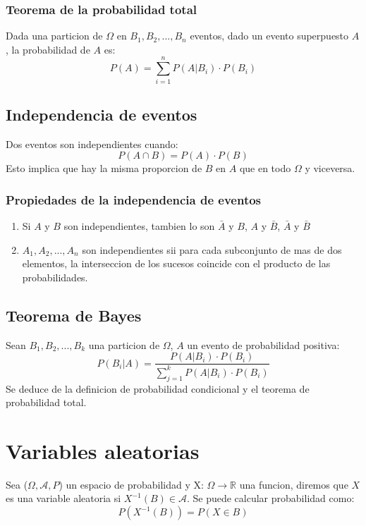 \documentclass[titlepage,a4paper]{article}
\begin{document}
\subsubsection*{Teorema de la probabilidad total}
Dada una particion de $\Omega$ en $B_{1},B_{2},...,B_{n}$ eventos, dado un evento superpuesto $A$, la probabilidad de $A$ es:
\begin{equation*}
    P(A) = \sum_{i=1}^{n} P(A|B_{i}) \cdot P(B_{i})
\end{equation*}

\subsection{Independencia de eventos}
Dos eventos son independientes cuando:
\begin{equation*}
    P (A \cap B) = P(A) \cdot P(B)
\end{equation*}
Esto implica que hay la misma proporcion de $B$ en $A$ que en todo $\Omega$ y viceversa.

\subsubsection*{Propiedades de la independencia de eventos}
\begin{enumerate}
    \item Si $A$ y $B$ son independientes, tambien lo son $\bar{A}$ y $B$, $A$ y $\bar{B}$, $\bar{A}$ y $\bar{B}$
    \item $A_{1},A_{2},...,A_{n}$ son independientes sii para cada subconjunto de mas de dos elementos, la interseccion de los sucesos coincide con el producto de las probabilidades.
\end{enumerate}


\subsection{Teorema de Bayes}
Sean $B_{1},B_{2},...,B_{k}$ una particion de $\Omega$, $A$ un evento de probabilidad positiva:
\begin{equation*}
    P(B_{i}|A) = \frac{P(A|B_{i}) \cdot P(B_{i})}{\sum_{j=1}^{k} P(A|B_{i}) \cdot P(B_{i})}
\end{equation*}
Se deduce de la definicion de probabilidad condicional y el teorema de probabilidad total.

\section{Variables aleatorias}
Sea ($\Omega, \mathcal{A}, P$) un espacio de probabilidad y $ \text{X: }\Omega \rightarrow \mathbb{R}$  una funcion, diremos que $X$ es una variable aleatoria si
$X^{-1}(B) \in \mathcal{A}$. Se puede calcular probabilidad como:
\begin{equation*}
    P(X^{-1}(B)) = P(X \in B)
\end{equation*}
\end{document}
